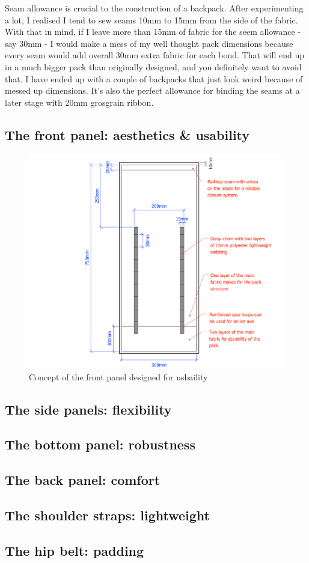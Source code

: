 \begin{note}
  Seam allowance is crucial to the construction of a backpack. After experimenting a lot, I realised I tend to sew seams 10mm to 15mm from the side of the fabric. With that in mind, if I leave more than 15mm of fabric for the seem allowance - say 30mm - I would make a mess of my well thought pack dimensions because every seam would add overall 30mm extra fabric for each bond. That will end up in a much bigger pack than originally designed, and you definitely want to avoid that. I have ended up with a couple of backpacks that just look weird because of messed up dimensions. It's also the perfect allowance for binding the seams at a later stage with 20mm grosgrain ribbon.
\end{note}

\subsection{The front panel: aesthetics \& usability}

\begin{figure}[H]
  \includegraphics[width=\textwidth]{media/sketches/pack-front.pdf}
  \caption{Concept of the front panel designed for usbaility}
  \label{img:pack-front-2D}
\end{figure}

\subsection{The side panels: flexibility}
\subsection{The bottom panel: robustness}
\subsection{The back panel: comfort}
\subsection{The shoulder straps: lightweight}
\subsection{The hip belt: padding}
